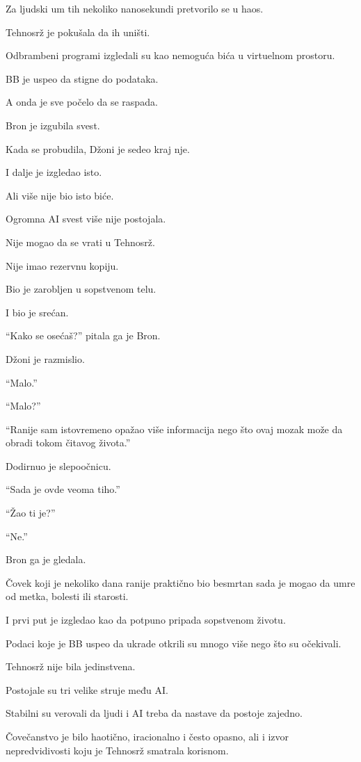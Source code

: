 Za ljudski um tih nekoliko nanosekundi pretvorilo se u haos.

Tehnosrž je pokušala da ih uništi.

Odbrambeni programi izgledali su kao nemoguća bića u virtuelnom prostoru.

BB je uspeo da stigne do podataka.

A onda je sve počelo da se raspada.

Bron je izgubila svest.

\bigskip

Kada se probudila, Džoni je sedeo kraj nje.

I dalje je izgledao isto.

Ali više nije bio isto biće.

Ogromna AI svest više nije postojala.

Nije mogao da se vrati u Tehnosrž.

Nije imao rezervnu kopiju.

Bio je zarobljen u sopstvenom telu.

I bio je srećan.

``Kako se osećaš?'' pitala ga je Bron.

Džoni je razmislio.

``Malo.''

``Malo?''

``Ranije sam istovremeno opažao više informacija nego što ovaj mozak može da obradi tokom čitavog života.''

Dodirnuo je slepoočnicu.

``Sada je ovde veoma tiho.''

``Žao ti je?''

``Ne.''

Bron ga je gledala.

Čovek koji je nekoliko dana ranije praktično bio besmrtan sada je mogao da umre od metka, bolesti ili starosti.

I prvi put je izgledao kao da potpuno pripada sopstvenom životu.

\bigskip

Podaci koje je BB uspeo da ukrade otkrili su mnogo više nego što su očekivali.

Tehnosrž nije bila jedinstvena.

Postojale su tri velike struje među AI.

Stabilni su verovali da ljudi i AI treba da nastave da postoje zajedno.

Čovečanstvo je bilo haotično, iracionalno i često opasno, ali i izvor nepredvidivosti koju je Tehnosrž smatrala korisnom.


